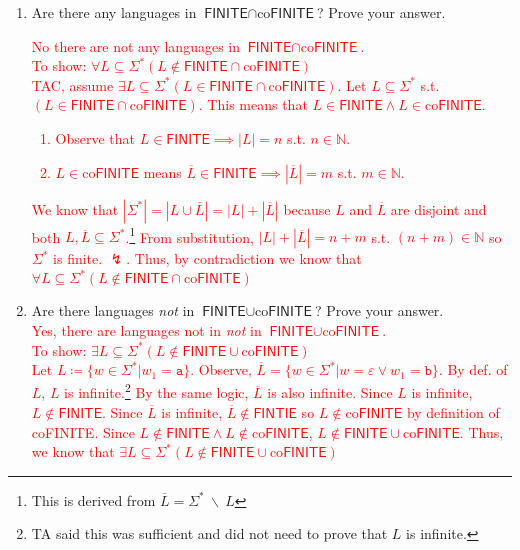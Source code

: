 \documentclass{article}
\newcommand{\e}{\varepsilon}
\newcommand{\s}{\Sigma}
\newcommand{\newp}{\\[2mm]}
\newcommand{\defeq}{\coloneqq}
\begin{document}
\begin{enumerate}
\begin{enumerate}
{\begin{quote}
            \end{quote}
        }
\newpage
        \item Are there any languages in $\textsf{FINITE} \cap \text{co}\textsf{FINITE}$? Prove your answer.\newp
        \textcolor{red}{
            No there are not any languages in $\textsf{FINITE} \cap \text{co}\textsf{FINITE}$.\newp
            To show: $ \forall L \subseteq \s^*(L \notin \textsf{FINITE} \cap \text{co}\textsf{FINITE}) $\newp
            TAC, assume $\exists L \subseteq \s^*(L \in \textsf{FINITE} \cap \text{co}\textsf{FINITE})$. Let $L \subseteq \s^*$ s.t. $(L \in \textsf{FINITE} \cap \text{co}\textsf{FINITE})$. This means that $L \in \textsf{FINITE} \land L \in \text{co}\textsf{FINITE}$.
            \begin{enumerate}
                \item [] Observe that $L \in \textsf{FINITE} \implies |L| = n$ s.t. $n \in \mathbb{N}$.
                \item []$L \in \text{co}\textsf{FINITE}$ means $\overline{L} \in \textsf{FINITE}\implies |\overline{L}| = m$ s.t. $m \in \mathbb{N}$.
            \end{enumerate}
            We know that $|\s^*|=|L \cup \overline{L}|=|L|+|\overline{L}|$ because $L$ and $\overline{L}$ are disjoint and both $L,\overline{L} \subseteq \s^*$.\footnote{This is derived from $\overline{L} = \s^* \:\backslash \: L$} From substitution, $|L|+|\overline{L}|=n+m$ s.t. $(n+m)\in \mathbb{N}$ so $\s^*$ is finite. $\lightning$. Thus, by contradiction we know that $ \forall L \subseteq \s^*(L \notin \textsf{FINITE} \cap \text{co}\textsf{FINITE}) $
        }
        \item Are there languages \textit{not} in $\textsf{FINITE} \cup \text{co}\textsf{FINITE}$? Prove your answer.\newp
        \textcolor{red}{
        Yes, there are languages not in \textit{not} in $\textsf{FINITE} \cup \text{co}\textsf{FINITE}$.\newp
        To show: $ \exists L \subseteq \s^*(L \notin \textsf{FINITE} \cup \text{co}\textsf{FINITE}) $\newp
        Let $L \defeq \{ w\in \s^*| w_1 = \texttt{a}\}$. Observe, $\overline{L} = \{ w\in \s^*| w=\e \lor w_1 = \texttt{b}\}$. By def. of $L$, $L$ is infinite.\footnote{ TA said this was sufficient and did not need to prove that $L$ is infinite.} By the same logic, $\overline{L}$ is also infinite. Since $L$ is infinite, $L \notin \textsf{FINITE}$. Since $\overline{L}$ is infinite, $\overline{L} \notin \textsf{FINTIE}$ so $L \notin \text{co}\textsf{FINITE}$ by definition of co\textsf{FINITE}. Since $L \notin \textsf{FINITE} \land L \notin \text{co}\textsf{FINITE}$, $L \notin \textsf{FINITE} \cup \text{co}\textsf{FINITE}$. Thus, we know that $ \exists L \subseteq \s^*(L \notin \textsf{FINITE} \cup \text{co}\textsf{FINITE}) $
        }
        
    \end{enumerate}
\end{enumerate}
\end{document}

